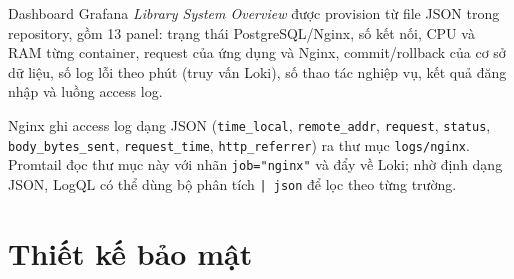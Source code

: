\documentclass[../main.tex]{subfiles}
\begin{document}
Dashboard Grafana \textit{Library System Overview} được provision từ file JSON trong repository, gồm 13 panel: trạng thái PostgreSQL/Nginx, số kết nối, CPU và RAM từng container, request của ứng dụng và Nginx, commit/rollback của cơ sở dữ liệu, số log lỗi theo phút (truy vấn Loki), số thao tác nghiệp vụ, kết quả đăng nhập và luồng access log.

Nginx ghi access log dạng JSON (\texttt{time\_local}, \texttt{remote\_addr}, \texttt{request}, \texttt{status}, \texttt{body\_bytes\_sent}, \texttt{request\_time}, \texttt{http\_referrer}) ra thư mục \texttt{logs/nginx}. Promtail đọc thư mục này với nhãn \texttt{job="nginx"} và đẩy về Loki; nhờ định dạng JSON, LogQL có thể dùng bộ phân tích \texttt{| json} để lọc theo từng trường.

\section{Thiết kế bảo mật}
\label{sec:thiet-ke-bao-mat}
\end{document}
